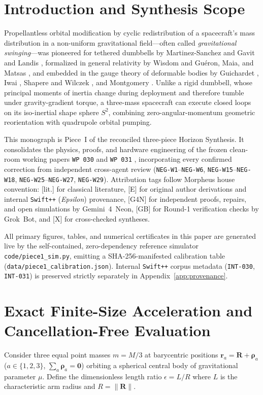 \documentclass[11pt]{amsart}
\numberwithin{equation}{section}
\theoremstyle{plain}
\theoremstyle{definition}\newtheorem{definition}[theorem]{Definition}
\theoremstyle{remark}\newtheorem{remark}[theorem]{Remark}
\newcommand{\ctag}[1]{\textup{\textsf{\scriptsize[#1]}}}
\begin{document}
\section{Introduction and Synthesis Scope}
Propellantless orbital modification by cyclic redistribution of a spacecraft's mass distribution in a non-uniform gravitational field---often called \emph{gravitational swinging}---was pioneered for tethered dumbbells by Martinez-Sanchez and Gavit \cite{martinez1987} and Landis \cite{landis1990,landis1992}, formalized in general relativity by Wisdom \cite{wisdom2003} and Gu\'eron, Maia, and Matsas \cite{gueron2006}, and embedded in the gauge theory of deformable bodies by Guichardet \cite{guichardet1984}, Iwai \cite{iwai1987}, Shapere and Wilczek \cite{shapere1989a,shapere1989b}, and Montgomery \cite{montgomery1993}. Unlike a rigid dumbbell, whose principal moments of inertia change during deployment and therefore tumble under gravity-gradient torque, a three-mass spacecraft can execute closed loops on its iso-inertial shape sphere $S^2$, combining zero-angular-momentum geometric reorientation with quadrupole orbital pumping.

This monograph is Piece~I of the reconciled three-piece Horizon Synthesis. It consolidates the physics, proofs, and hardware engineering of the frozen clean-room working papers \texttt{WP~030} and \texttt{WP~031} \cite{ergentics2026wp030}, incorporating every confirmed correction from independent cross-agent review (\texttt{NEG-W1}--\texttt{NEG-W6}, \texttt{NEG-W15}--\texttt{NEG-W18}, \texttt{NEG-W25}--\texttt{NEG-W27}, \texttt{NEG-W29}). Attribution tags follow Morpheus house convention: \ctag{lit.} for classical literature, \ctag{E} for original author derivations and internal \texttt{Swift++} (\emph{Epsilon}) provenance, \ctag{G4N} for independent proofs, repairs, and open simulations by Gemini~4~Neon, \ctag{GB} for Round-1 verification checks by Grok~Bot, and \ctag{X} for cross-checked syntheses.

All primary figures, tables, and numerical certificates in this paper are generated live by the self-contained, zero-dependency reference simulator \texttt{code/piece1\_sim.py}, emitting a SHA-256-manifested calibration table (\texttt{data/piece1\_calibration.json}). Internal \texttt{Swift++} corpus metadata (\texttt{INT-030}, \texttt{INT-031}) is preserved strictly separately in Appendix~\ref{app:provenance}.

\section{Exact Finite-Size Acceleration and Cancellation-Free Evaluation}
Consider three equal point masses $m = M/3$ at barycentric positions $\mathbf{r}_a = \mathbf{R} + \boldsymbol{\rho}_a$ ($a \in \{1,2,3\}$, $\sum_a \boldsymbol{\rho}_a = \mathbf{0}$) orbiting a spherical central body of gravitational parameter $\mu$. Define the dimensionless length ratio $\epsilon = L/R$ where $L$ is the characteristic arm radius and $R = \|\mathbf{R}\|$.
\end{document}
